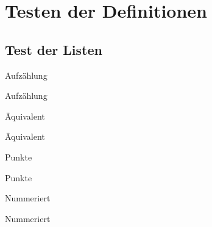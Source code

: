 
\thispagestyle{empty}
\section{Testen der Definitionen}
\subsection{Test der Listen}\label{subsec:listen}
\begin{myenumerate}
\item
Aufzählung
\item
Aufzählung
\end{myenumerate}
\begin{myequivalent}
\item
Äquivalent
\item
Äquivalent
\end{myequivalent}
\begin{myitemize}
\item
Punkte
\item
Punkte
\end{myitemize}
\begin{mynumber}
\item
Nummeriert
\item
Nummeriert
\end{mynumber}
